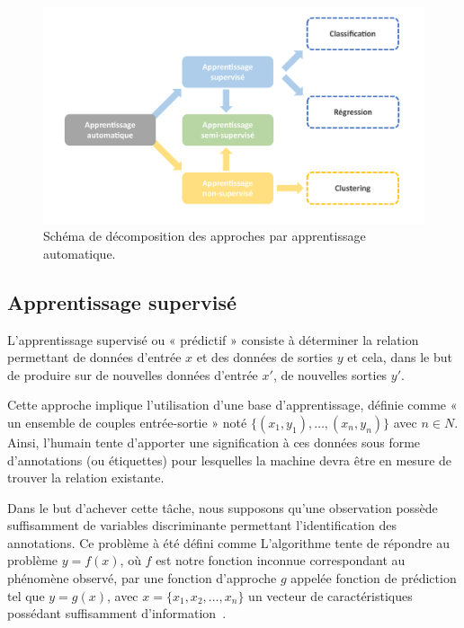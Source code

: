  \begin{figure}[H]
    \centering 
    \includegraphics[width=\linewidth]{contents/chapter_3/resources/scheme_machine_learning.pdf}
    \caption{Schéma de décomposition des approches par apprentissage automatique.}
    \label{fig:scheme_machine_learning}
\end{figure}

\subsection{Apprentissage supervisé}
L’apprentissage supervisé ou « prédictif » consiste à déterminer la relation permettant de données d’entrée $x$ et des données de sorties $y$ et cela, dans le but de produire sur de nouvelles données d’entrée $x'$, de nouvelles sorties $y'$.\par

Cette approche implique l’utilisation d’une base d’apprentissage, définie comme « un ensemble de couples entrée-sortie » noté $\{(x_1,y_1 ),\ldots,(x_n,y_n )\}$ avec $n \in N$. Ainsi, l’humain tente d'apporter une signification à ces données sous forme d'annotations (ou étiquettes) pour lesquelles la machine devra être en mesure de trouver la relation existante.\par

Dans le but d'achever cette tâche, nous supposons qu'une observation possède suffisamment de variables discriminante permettant l'identification des annotations. Ce problème à été défini comme 
L’algorithme tente de répondre au problème $y=f(x)$, où $f$ est notre fonction inconnue correspondant au phénomène observé, par une fonction d’approche $g$ appelée fonction de prédiction tel que $y=g(x)$, avec $x=\{x_1,x_2,\ldots,x_n\}$ un vecteur de caractéristiques possédant suffisamment d'information~\cite{foulds2010}.\par 

